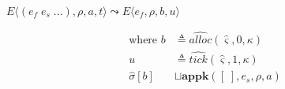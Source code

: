 \documentclass[12pt,draft]{article}
\begin{document}
\begin{multicols*}{2}
\begin{align*}
\end{align*}
\begin{center}
  $E\langle (e_f\;e_s\;...) , \rho , a , t \rangle
  \leadsto E\langle e_f , \rho , b , u \rangle$
\end{center}
\vspace{-7mm}
\begin{align*}
\text{where } b &\triangleq \widehat{alloc}(\hat{\varsigma}, 0, \kappa) \\
u &\triangleq \widehat{tick}(\hat{\varsigma}, 1, \kappa) \\
\hat{\sigma}[b] &\sqcup \textbf{appk}([\;],  e_s , \rho, a)
\end{align*}
\end{multicols*}


\newpage
\end{document}
